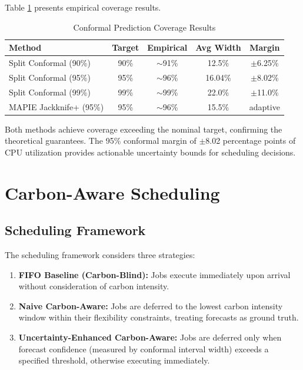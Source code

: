 \documentclass[12pt]{report}
\begin{document}
Table \ref{tab:conformal_coverage} presents empirical coverage results.

\begin{table}[H]
\centering
\caption{Conformal Prediction Coverage Results}
\label{tab:conformal_coverage}
\begin{tabular}{lcccc}
\toprule
\textbf{Method} & \textbf{Target} & \textbf{Empirical} & \textbf{Avg Width} & \textbf{Margin} \\
\midrule
Split Conformal (90\%) & 90\% & $\sim$91\% & 12.5\% & $\pm$6.25\% \\
Split Conformal (95\%) & 95\% & $\sim$96\% & 16.04\% & $\pm$8.02\% \\
Split Conformal (99\%) & 99\% & $\sim$99\% & 22.0\% & $\pm$11.0\% \\
MAPIE Jackknife+ (95\%) & 95\% & $\sim$96\% & 15.5\% & adaptive \\
\bottomrule
\end{tabular}
\end{table}

Both methods achieve coverage exceeding the nominal target, confirming the theoretical guarantees. The 95\% conformal margin of $\pm$8.02 percentage points of CPU utilization provides actionable uncertainty bounds for scheduling decisions.

\section{Carbon-Aware Scheduling}

\subsection{Scheduling Framework}

The scheduling framework considers three strategies:

\begin{enumerate}
    \item \textbf{FIFO Baseline (Carbon-Blind):} Jobs execute immediately upon arrival without consideration of carbon intensity.
    
    \item \textbf{Naive Carbon-Aware:} Jobs are deferred to the lowest carbon intensity window within their flexibility constraints, treating forecasts as ground truth.
    
    \item \textbf{Uncertainty-Enhanced Carbon-Aware:} Jobs are deferred only when forecast confidence (measured by conformal interval width) exceeds a specified threshold, otherwise executing immediately.
\end{enumerate}
\end{document}
